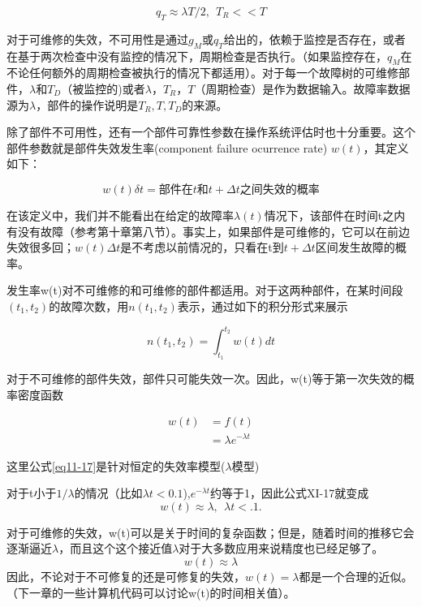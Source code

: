 \documentclass[cn,11pt,chinese]{elegantbook}
\begin{document}
{\begin{equation}\label{eq11-13}
q_T \approx \lambda T/2, \ \ T_R<<T
\end{equation}

对于可维修的失效，不可用性是通过$g_M$或$q_T$给出的，依赖于监控是否存在，或者在基于两次检查中没有监控的情况下，周期检查是否执行。（如果监控存在，$q_M$在不论任何额外的周期检查被执行的情况下都适用）。对于每一个故障树的可维修部件，$\lambda$和$T_D$（被监控的)或者$\lambda$，$T_R$，$T$（周期检查）是作为数据输入。故障率数据源为$\lambda$，部件的操作说明是$T_R,T,T_D$的来源。

除了部件不可用性，还有一个部件可靠性参数在操作系统评估时也十分重要。这个部件参数就是部件失效发生率(component failure ocurrence rate) $w(t)$，其定义如下：

\begin{equation}\label{eq11-14}
w(t)\delta t= 部件在t和t+\Delta t之间失效的概率 
\end{equation}

在该定义中，我们并不能看出在给定的故障率$\lambda(t)$情况下，该部件在时间t之内有没有故障（参考第十章第八节）。事实上，如果部件是可维修的，它可以在前边失效很多回；$w(t)\Delta t$是不考虑以前情况的，只看在t到$t+\Delta t$区间发生故障的概率。

发生率w(t)对不可维修的和可维修的部件都适用。对于这两种部件，在某时间段$(t_1,t_2)$的故障次数，用$n(t_1,t_2)$表示，通过如下的积分形式来展示

\begin{equation}\label{eq11-15}
n(t_1,t_2)=\int_{t_1}^{t_2} w(t)dt
\end{equation}

对于不可维修的部件失效，部件只可能失效一次。因此，w(t)等于第一次失效的概率密度函数

\begin{equation}
\label{eq11-17}
\begin{split}
w(t)&=f(t) \\
&=\lambda e^{-\lambda t}   
\end{split} 
\end{equation}

这里公式\ref{eq11-17}是针对恒定的失效率模型($\lambda$模型)

对于t小于$1/\lambda$的情况（比如$\lambda t<0.1$),$e^{-\lambda t}$约等于1，因此公式XI-17就变成
$$w(t)\approx \lambda ,\ \ \lambda t<.1.$$

对于可维修的失效，w(t)可以是关于时间的复杂函数；但是，随着时间的推移它会逐渐逼近$\lambda$，而且这个这个接近值$\lambda$对于大多数应用来说精度也已经足够了。
$$w(t) \approx \lambda$$
因此，不论对于不可修复的还是可修复的失效，$w(t)=\lambda$都是一个合理的近似。（下一章的一些计算机代码可以讨论w(t)的时间相关值）。

}
\end{document}
